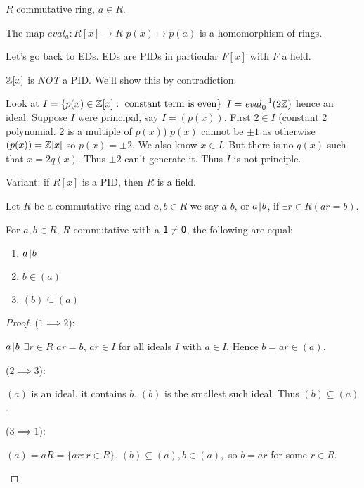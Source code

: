 \documentclass[notes.tex]{subfiles}
\begin{document}
\begin{remark}
	$R$ commutative ring, $a\in R$.

	The map $\mathit{eval}_a:R[x]\to R$ $p(x) \mapsto p(a)$ is a homomorphism of rings.
\end{remark}

Let's go back to EDs. EDs are PIDs in particular $F[x]$ with $F$ a field.

\begin{eg}
	$\mathbb{Z}[x]$ is \emph{NOT} a PID. We'll show this by contradiction.

	Look at $I = \{p(x)\in\mathbb{Z}[x] : \text{ constant term is even}\}$ $I = \mathit{eval}_0^{-1}(2\mathbb{Z})$ hence an ideal.
	Suppose $I$ were principal, say $I = (p(x))$. First $2\in I$ (constant 2 polynomial. 2 is a multiple of $p(x)$) $p(x)$ cannot be $\pm 1$ as otherwise $(p(x)) = \mathbb{Z}[x]$ so $p(x) = \pm 2$. We also know $x \in I$. But there is no $q(x)$ such that $x = 2q(x)$. Thus $\pm2$ can't generate it. Thus $I$ is not principle.

	Variant: if $R[x]$ is a PID, then $R$ is a field.
\end{eg}


\begin{defn}
	Let $R$ be a commutative ring and $a,b\in R$ we say $a$  $b$, or $a\mkern2mu|\mkern1mu b$, if $\exists r\in R (ar = b)$.
\end{defn}

\begin{proposition}
	For $a, b\in R$, $R$ commutative with a $\mathsf{1}\ne\mathsf{0}$, the following are equal:
	\begin{enumerate}
		\item $a\mkern2mu|\mkern1mu b$
		\item $b\in (a)$
		\item $(b)\subseteq (a)$
	\end{enumerate}
\end{proposition}

\begin{proof}
	($1\implies 2$):
	\begin{tabin}
		$a\mkern2mu|\mkern1mu b$ $\exists r\in R$ $ar=b$, $ar\in I$ for all ideals $I$ with $a\in I$. Hence $b=ar \in (a)$.
	\end{tabin}
	($2\implies 3$):
	\begin{tabin}
		$(a)$ is an ideal, it contains $b$. $(b)$ is the smallest such ideal. Thus $(b)\subseteq (a)$.
	\end{tabin}
	($3\implies 1$):
	\begin{tabin}
		$(a) = aR = \{ar:r\in R\}$. 
		$(b)\subseteq (a), b\in (a),$ so $b=ar$ for some $r\in R$. 
	\end{tabin}
\end{proof}
\end{document}
